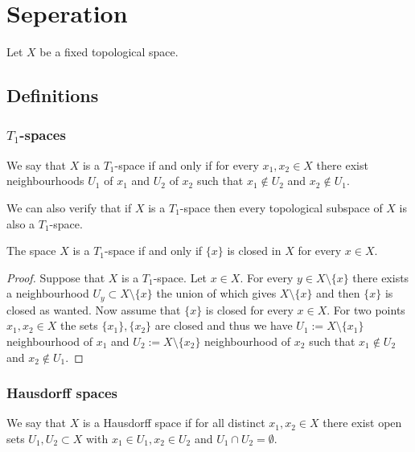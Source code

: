 \documentclass[11pt,a4paper]{article}
\begin{document}
\newpage

\section{Seperation}

Let $X$ be a fixed topological space.

\subsection{Definitions}

\subsubsection{\texorpdfstring{$T_1$}{}-spaces}

\begin{definition}[$T_1$-spaces]
  We say that $X$ is a $T_1$-space if and only if for every
  $x_1, x_2 \in X$ there exist neighbourhoods $U_1$ of $x_1$ and $U_2$ of
  $x_2$ such that $x_1 \notin U_2$ and $x_2 \notin U_1$.
\end{definition}

\begin{remark}
  We can also verify that if $X$ is a $T_1$-space then every topological
  subspace of $X$ is also a $T_1$-space.
\end{remark}

\begin{proposition}
  The space $X$ is a $T_1$-space if and only if $\{x\}$ is 
  closed in $X$ for every $x \in X$.
\end{proposition}
\begin{proof}
  Suppose that $X$ is a $T_1$-space. Let $x \in X$. For every 
  $y \in X \setminus \{x\}$ there exists a neighbourhood 
  $U_y \subset X \setminus \{x\}$ the union of which gives 
  $X \setminus \{x\}$ and then $\{x\}$ is closed as wanted. Now
  assume that $\{x\}$ is closed for every $x \in X$. For two points
  $x_1,x_2 \in X$ the sets $\{x_1\},\{x_2\}$ are closed and thus
  we have $U_1 := X \setminus \{x_1\}$ neighbourhood of $x_1$ and
  $U_2 := X \setminus \{x_2\}$ neighbourhood of $x_2$ such that
  $x_1 \notin U_2$ and $x_2 \notin U_1$.
\end{proof}

\subsubsection{Hausdorff spaces}

\begin{definition}
  We say that $X$ is a Hausdorff space if for all distinct 
  $x_1, x_2 \in X$ there exist open sets $U_1, U_2 \subset X$ with 
  $x_1 \in U_1, x_2 \in U_2$ and $U_1 \cap U_2 = \emptyset$.
\end{definition}
\end{document}
